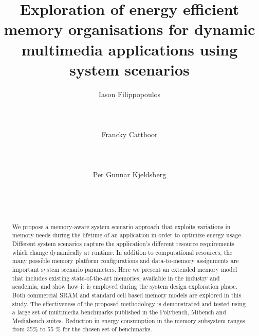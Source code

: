 \documentclass{acm_proc_article-sp}
\begin{document}
\title{Exploration of energy efficient memory organisations for dynamic multimedia applications using system scenarios}

\author{
\alignauthor
Iason Filippopoulos\\
		\\
		\\
       \\
\alignauthor
Francky Catthoor\\
       \\
       \\
       \\
\alignauthor     
Per Gunnar Kjeldsberg\\
		\\
		\\
       \\
}       

\maketitle

\begin{abstract}
We propose a memory-aware system scenario approach that exploits variations in memory needs during the lifetime of an application in order to optimize energy usage. Different system scenarios capture the application's different resource requirements which change dynamically at runtime. In addition to computational resources, the many possible memory platform configurations and data-to-memory assignments are important system scenario parameters. Here we present an extended memory model that includes existing state-of-the-art memories, available in the industry and academia, and show how it is employed during the system design exploration phase. Both commercial SRAM and standard cell based memory models are explored in this study. The effectiveness of the proposed methodology is demonstrated and tested using a large set of multimedia benchmarks published in the Polybench, Mibench and Mediabench suites. Reduction in energy consumption in the memory subsystem ranges from 35\% to 55 \% for the chosen set of benchmarks.
\end{abstract}
\end{document}
